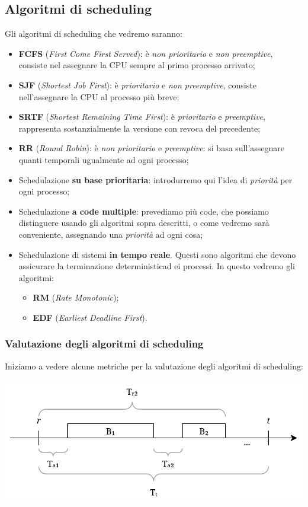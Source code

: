 \documentclass[a4paper,11pt]{article}
\begin{document}
\subsection{Algoritmi di scheduling}
Gli algoritmi di scheduling che vedremo saranno:
\begin{itemize}
	\item \textbf{FCFS} (\textit{First Come First Served}): è \textit{non prioritario} e \textit{non preemptive}, consiste nel assegnare la CPU sempre al primo processo arrivato;
	\item \textbf{SJF} (\textit{Shortest Job First}): è \textit{prioritario} e \textit{non preemptive}, consiste nell'assegnare la CPU al processo più breve;
	\item \textbf{SRTF} (\textit{Shortest Remaining Time First}): è \textit{prioritario} e \textit{preemptive}, rappresenta sostanzialmente la versione con revoca del precedente;
	\item \textbf{RR} (\textit{Round Robin}): è \textit{non prioritario} e \textit{preemptive}: si basa sull'assegnare quanti temporali ugualmente ad ogni processo;
	\item Schedulazione \textbf{su base prioritaria}: introdurremo qui l'idea di \textit{priorità} per ogni processo;
	\item Schedulazione \textbf{a code multiple}: prevediamo più code, che possiamo distinguere usando gli algoritmi sopra descritti, o come vedremo sarà conveniente, assegnando una \textit{priorità} ad ogni cosa;
	\item Schedulazione di sistemi \textbf{in tempo reale}. Questi sono algoritmi che devono assicurare la terminazione deterministicad ei processi. In questo vedremo gli algoritmi:
		\begin{itemize}
			\item \textbf{RM} (\textit{Rate Monotonic});
			\item \textbf{EDF} (\textit{Earliest Deadline First}).
		\end{itemize}
\end{itemize}

\subsubsection{Valutazione degli algoritmi di scheduling}
Iniziamo a vedere alcune metriche per la valutazione degli algoritmi di scheduling:

\begin{center}
	\includegraphics[scale=0.4]{../figures/scheduling_valuta.png}
\end{center}
\end{document}

